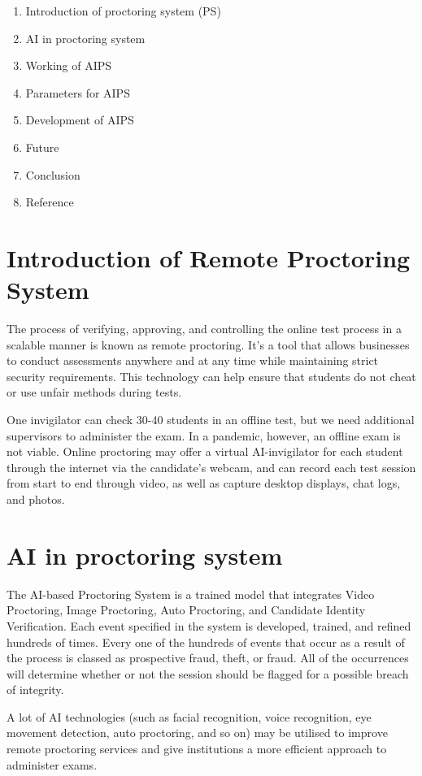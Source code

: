 \documentclass[10pt,a4paper,twoside]{article}
\begin{document}
\item 
\begin{enumerate}
\item Introduction of proctoring system (PS)
\item AI in proctoring system
\item Working of AIPS
\item Parameters for AIPS
\item Development of AIPS
\item Future
\item Conclusion
\item Reference 
\end{enumerate}


\section{Introduction of Remote Proctoring System}
\item The process of verifying, approving, and controlling the online test process in a scalable manner is known as remote proctoring. It's a tool that allows businesses to conduct assessments anywhere and at any time while maintaining strict security requirements. This technology can help ensure that students do not cheat or use unfair methods during tests.
\item One invigilator can check 30-40 students in an offline test, but we need additional supervisors to administer the exam. In a pandemic, however, an offline exam is not viable. Online proctoring may offer a virtual AI-invigilator for each student through the internet via the candidate's webcam, and can record each test session from start to end through video, as well as capture desktop displays, chat logs, and photos.


\section{AI in proctoring system}
\item The AI-based Proctoring System is a trained model that integrates Video Proctoring, Image Proctoring, Auto Proctoring, and Candidate Identity Verification. Each event specified in the system is developed, trained, and refined hundreds of times. Every one of the hundreds of events that occur as a result of the process is classed as prospective fraud, theft, or fraud. All of the occurrences will determine whether or not the session should be flagged for a possible breach of integrity.
\item A lot of AI technologies (such as facial recognition, voice recognition, eye movement detection, auto proctoring, and so on) may be utilised to improve remote proctoring services and give institutions a more efficient approach to administer exams. 
\end{document}
